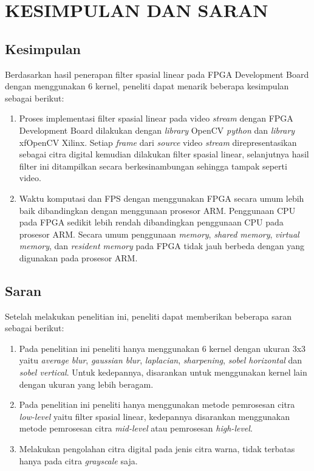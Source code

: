 
\chapter{KESIMPULAN DAN SARAN}

\section{Kesimpulan}
Berdasarkan hasil penerapan filter spasial linear pada FPGA Development Board dengan menggunakan 6 kernel, peneliti dapat menarik beberapa kesimpulan sebagai berikut:
\begin{enumerate}[topsep=0pt,itemsep=0pt,partopsep=0pt, parsep=0pt]
    \item Proses implementasi filter spasial linear pada video \textit{stream} dengan FPGA Development Board dilakukan dengan \textit{library} OpenCV \textit{python} dan \textit{library} xfOpenCV Xilinx. Setiap \textit{frame} dari \textit{source} video \textit{stream} direpresentasikan sebagai citra digital kemudian dilakukan filter spasial linear, selanjutnya hasil filter ini ditampilkan secara berkesinambungan sehingga tampak seperti video.
    \item Waktu komputasi dan FPS dengan menggunakan FPGA secara umum lebih baik dibandingkan dengan menggunaan prosesor ARM. Penggunaan CPU pada FPGA sedikit lebih rendah dibandingkan penggunaan CPU pada prosesor ARM. Secara umum penggunaan \textit{memory}, \textit{shared memory}, \textit{virtual memory}, dan \textit{resident memory} pada FPGA tidak jauh berbeda dengan yang digunakan pada prosesor ARM.
\end{enumerate}


\section{Saran}
Setelah melakukan penelitian ini, peneliti dapat memberikan beberapa saran sebagai berikut:
\begin{enumerate}[topsep=0pt,itemsep=0pt,partopsep=0pt, parsep=0pt]
    \item Pada penelitian ini peneliti hanya menggunakan 6 kernel dengan ukuran 3x3 yaitu \textit{average blur}, \textit{gaussian blur}, \textit{laplacian}, \textit{sharpening}, \textit{sobel horizontal} dan \textit{sobel vertical}. Untuk kedepannya, disarankan untuk menggunakan kernel lain dengan ukuran yang lebih beragam.
    \item Pada penelitian ini peneliti hanya menggunakan metode pemrosesan citra \textit{low-level} yaitu filter spasial linear, kedepannya disarankan menggunakan metode pemrosesan citra \textit{mid-level} atau pemrosesan \textit{high-level}.
    \item Melakukan pengolahan citra digital pada jenis citra warna, tidak terbatas hanya pada citra \textit{grayscale} saja.
\end{enumerate}